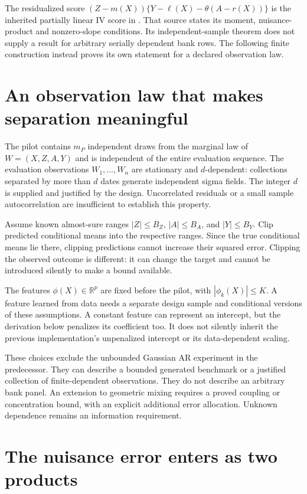 The residualized score
$(Z-m(X))\{Y-\ell(X)-\theta(A-r(X))\}$ is the inherited partially linear IV
score in \citet[Section~4.2, equation~(4.8)]{dml2018}. That source states its
moment, nuisance-product and nonzero-slope conditions. Its independent-sample
theorem does not supply a result for arbitrary serially dependent bank rows.
The following finite construction instead proves its own statement for a
declared observation law.

\section{An observation law that makes separation meaningful}

The pilot contains $m_P$ independent draws from the marginal law of
$W=(X,Z,A,Y)$ and is independent of the entire evaluation sequence. The
evaluation observations $W_1,\ldots,W_n$ are stationary and $d$-dependent:
collections separated by more than $d$ dates generate independent sigma fields.
The integer $d$ is supplied and justified by the design. Uncorrelated residuals
or a small sample autocorrelation are insufficient to establish this property.

Assume known almost-sure ranges $|Z|\le B_Z$, $|A|\le B_A$, and $|Y|\le B_Y$.
Clip predicted conditional means into the respective ranges. Since the true
conditional means lie there, clipping predictions cannot increase their squared
error. Clipping the observed outcome is different: it can change the target
and cannot be introduced silently to make a bound available.

The features $\phi(X)\in\mathbb R^p$ are fixed before the pilot, with
$|\phi_k(X)|\le K$. A feature learned from data needs a separate design sample
and conditional versions of these assumptions. A constant feature can represent
an intercept, but the derivation below penalizes its coefficient too. It does
not silently inherit the previous implementation's unpenalized intercept or
its data-dependent scaling.

These choices exclude the unbounded Gaussian AR experiment in the predecessor.
They can describe a bounded generated benchmark or a justified collection of
finite-dependent observations. They do not describe an arbitrary bank panel.
An extension to geometric mixing requires a proved coupling or concentration
bound, with an explicit additional error allocation. Unknown dependence remains
an information requirement.

\section{The nuisance error enters as two products}

